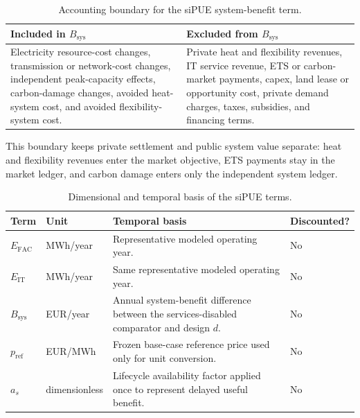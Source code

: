 \documentclass[preprint,12pt]{elsarticle}
\begin{document}
\begin{table}[H]
\centering
\small
\caption{Accounting boundary for the siPUE system-benefit term.}
\label{tab:sipue-boundary}
\begin{tabularx}{\linewidth}{X X}
\toprule
Included in $B_{\text{sys}}$ & Excluded from $B_{\text{sys}}$ \\
\midrule
Electricity resource-cost changes, transmission or network-cost changes, independent peak-capacity effects, carbon-damage changes, avoided heat-system cost, and avoided flexibility-system cost. & Private heat and flexibility revenues, IT service revenue, ETS or carbon-market payments, capex, land lease or opportunity cost, private demand charges, taxes, subsidies, and financing terms. \\
\bottomrule
\end{tabularx}
\end{table}

This boundary keeps private settlement and public system value separate: heat and flexibility revenues enter the market objective, ETS payments stay in the market ledger, and carbon damage enters only the independent system ledger.

\begin{table}[H]
\centering
\small
\caption{Dimensional and temporal basis of the siPUE terms.}
\label{tab:sipue-units}
\begin{tabularx}{\linewidth}{L{2.7cm} L{2.4cm} X L{2.2cm}}
\toprule
Term & Unit & Temporal basis & Discounted? \\
\midrule
$E_{\text{FAC}}$ & MWh/year & Representative modeled operating year. & No \\
$E_{\text{IT}}$ & MWh/year & Same representative modeled operating year. & No \\
$B_{\text{sys}}$ & EUR/year & Annual system-benefit difference between the services-disabled comparator and design $d$. & No \\
$p_{\text{ref}}$ & EUR/MWh & Frozen base-case reference price used only for unit conversion. & No \\
$a_s$ & dimensionless & Lifecycle availability factor applied once to represent delayed useful benefit. & No \\
\bottomrule
\end{tabularx}
\end{table}
\end{document}
